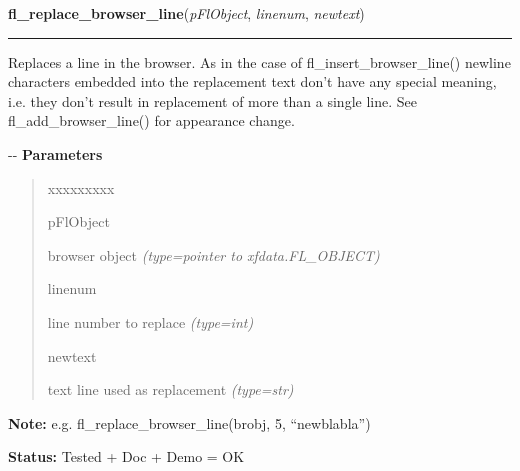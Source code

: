 \hspace{.8\funcindent}\begin{boxedminipage}{\funcwidth}

    \raggedright \textbf{fl\_replace\_browser\_line}(\textit{pFlObject}, \textit{linenum}, \textit{newtext})

    \vspace{-1.5ex}

    \rule{\textwidth}{0.5\fboxrule}
\setlength{\parskip}{2ex}

Replaces a line in the browser. As in the case of
fl\_insert\_browser\_line() newline characters embedded into the replacement
text don't have any special meaning, i.e. they don't result in replacement
of more than a single line. See fl\_add\_browser\_line() for appearance
change.

-{}-
\setlength{\parskip}{1ex}
      \textbf{Parameters}
      \vspace{-1ex}

      \begin{quote}
        \begin{Ventry}{xxxxxxxxx}

          \item[pFlObject]


browser object
            {\it (type=pointer to xfdata.FL\_OBJECT)}

          \item[linenum]


line number to replace
            {\it (type=int)}

          \item[newtext]


text line used as replacement
            {\it (type=str)}

        \end{Ventry}

      \end{quote}

\textbf{Note:} 
e.g. fl\_replace\_browser\_line(brobj, 5, ``newblabla'')


\textbf{Status:} 
Tested + Doc + Demo = OK


    \end{boxedminipage}

    \label{xformslib:flbrowser:fl_get_browser_line}

    \vspace{0.5ex}

